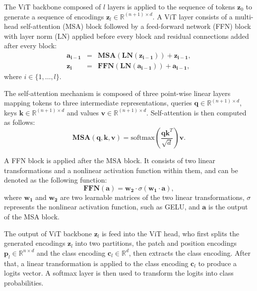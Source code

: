 The ViT backbone composed of $l$ layers is applied to the sequence of tokens $\mathbf{z}_0$ to generate a sequence of encodings $\mathbf{z}_l \in \mathbb{R} ^ {(n+1) \times d}$.
A ViT layer consists of a multi-head self-attention (MSA) block followed by a feed-forward network (FFN) block with layer norm (LN) applied before every block and residual connections added after every block:
\begin{eqnarray}
  \mathbf{a_{i-1}} &=& \mathbf{MSA}(\mathbf{LN}(\mathbf{z_{i-1}})) + \mathbf{z_{i-1}} , \\
  \mathbf{z_{i}} &=& \mathbf{FFN}(\mathbf{LN}(\mathbf{a_{i-1}})) + \mathbf{a_{i-1}},
\end{eqnarray}
where $i \in \{1,\ldots,l\}$.

The self-attention mechanism is composed of three point-wise linear layers mapping tokens to three intermediate representations, queries $\mathbf{q} \in \mathbb{R}^{(n+1) \times d}$, keys $\mathbf{k} \in \mathbb{R}^{(n+1) \times d}$ and values $\mathbf{v} \in \mathbb{R}^{(n+1) \times d}$.
Self-attention is then computed as follows:
\begin{equation}
   \mathbf{MSA}(\mathbf{q}, \mathbf{k}, \mathbf{v}) = \mathrm{softmax} \left( \frac{\mathbf{q}\mathbf{k}^T}{\sqrt{d}} \right)  \mathbf{v}.
\end{equation}

A FFN block is applied after the MSA block. It consists of two linear transformations and a nonlinear activation function within them, and can be denoted as the following function:
\begin{equation}
  \mathbf{FFN}(\mathbf{a}) = \mathbf{w_2} \cdot \sigma(\mathbf{w_1} \cdot \mathbf{a}),
\end{equation}
where $\mathbf{w_1}$ and $\mathbf{w_2}$ are two learnable matrices of the two linear transformations, $\sigma$ represents the nonlinear activation function, such as GELU, and  $\mathbf{a}$ is the output of the MSA block.

The output of ViT backbone $\mathbf{z}_l$ is feed into the ViT head, who first splits the generated encodings $\mathbf{z}_l$ into two partitions, the patch and position encodings $\mathbf{p}_l \in \mathbb{R} ^ {n \times d}$ and the class encoding $\mathbf{c}_l \in \mathbb{R}^d$, then extracts the class encoding.
After that, a linear transformation is applied to the class encoding $\mathbf{c}_l$ to produce a logits vector. A softmax layer is then used to transform the logits into class probabilities.

